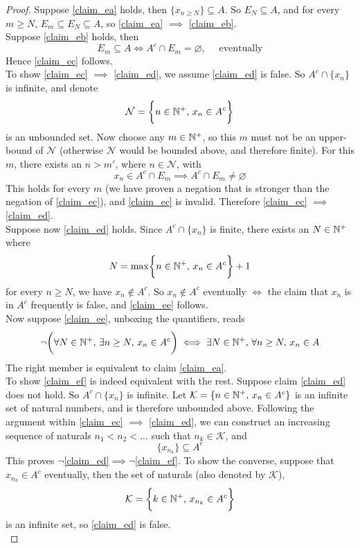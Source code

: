 \documentclass[../../main.tex]{subfiles}
\begin{document}
\begin{proof}
    Suppose \ref{claim_ea} holds, then $\{x_{n\geq N}\}\subseteq A$. So $E_N\subseteq A$, and for every $m\geq N$, $E_m\subseteq E_N\subseteq A$, so \ref{claim_ea} $\implies$ \ref{claim_eb}.\\
    
    Suppose \ref{claim_eb} holds, then 
    \[
    E_m\subseteq A\iff A^c\cap E_m=\varnothing,\quad\text{ eventually}
    \]
    Hence \ref{claim_ec} follows.\\
    
    To show \ref{claim_ec} $\implies$ \ref{claim_ed}, we assume \ref{claim_ed} is false. So $A^c\cap\{x_n\}$ is infinite, and denote
    \[
    \mathcal{N}=\biggl\{n\in\mathbb{N}^+,\, x_n\in A^c\biggr\}
    \]
    is an unbounded set. Now choose any $m\in\mathbb{N}^+$, so this $m$ must not be an upper-bound of $\mathcal{N}$ (otherwise $\mathcal{N}$ would be bounded above, and therefore finite). For this $m$, there exists an $n>m'$, where $n\in\mathcal{N}$, with
    \[
    x_n\in A^c\cap E_m\implies A^c\cap E_m\neq\varnothing
    \]
    This holds for every $m$ (we have proven a negation that is stronger than the negation of \ref{claim_ec}), and \ref{claim_ec} is invalid. Therefore \ref{claim_ec} $\implies$ \ref{claim_ed}.\\
    
    Suppose now \ref{claim_ed} holds. Since $A^c\cap\{x_n\}$ is finite, there exists an $N\in\mathbb{N}^+$ where 
    \[
    N=\max\biggl\{n\in\mathbb{N}^+,\,x_n\in A^c\biggr\}+1
    \]
    for every $n\geq N$, we have $x_n\notin A^c$. So $x_n\notin A^c$ eventually $\iff$ the claim that  $x_n$ is in $A^c$ frequently is false, and \ref{claim_ee} follows.\\
    
    Now suppose \ref{claim_ee}, unboxing the quantifiers, reads
    \[
    \neg\biggl(\forall N\in\mathbb{N}^+,\,\exists n\geq N,\,x_n\in A^c\biggr)\iff \exists N\in\mathbb{N}^+,\,\forall n\geq N,\, x_n\in A
    \]
    The right member is equivalent to claim \ref{claim_ea}.\\
    
    To show \ref{claim_ef} is indeed equivalent with the rest. Suppose claim \ref{claim_ed} does not hold. So $A^c\cap \{x_n\}$ is infinite. Let $\mathcal{K}=\{n\in\mathbb{N}^+,\,x_n\in A^c\}$ is an infinite set of natural numbers, and is therefore unbounded above. Following the argument within \ref{claim_ec} $\implies$ \ref{claim_ed}, we can construct an increasing sequence of naturals $n_1<n_2<\ldots$ such that $n_k\in \mathcal{K}$, and
    \[
    \{x_{n_k}\}\subseteq A^c
    \]
    This proves $\neg$\ref{claim_ed}$\implies\neg$\ref{claim_ef}. To show the converse, suppose that $x_{n_k}\in A^c$ eventually, then the set of naturals (also denoted by $\mathcal{K}$), 
    \[
    \mathcal{K}=\biggl\{k\in\mathbb{N}^+,\,x_{n_k}\in A^c\biggr\}
    \]
    is an infinite set, so \ref{claim_ed} is false. \\
    

\end{proof}
\end{document}
